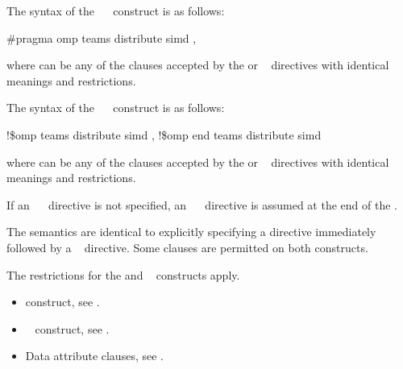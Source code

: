 \syntax
\ccppspecificstart
The syntax of the ~~ construct is as follows:

\begin{boxedcode}
\#pragma omp teams distribute simd \plc{[clause[ [},\plc{] clause] ... ]}
\end{boxedcode}

where  can be any of the clauses accepted by the  or ~ 
directives with identical meanings and restrictions.
\ccppspecificend

\fortranspecificstart
The syntax of the ~~ construct is as follows:

\begin{boxedcode}
!\$omp teams distribute simd \plc{[clause[ [},\plc{] clause] ... ]}
\plc{[}!\$omp end teams distribute simd\plc{]}
\end{boxedcode}

where  can be any of the clauses accepted by the  or ~ 
directives with identical meanings and restrictions.

If an ~~ directive is not specified, an 
~~ directive is assumed at the end of the .
\fortranspecificend

\descr
The semantics are identical to explicitly specifying a  directive immediately 
followed by a ~ directive. Some clauses are permitted on both constructs.

\restrictions
The restrictions for the  and ~ constructs apply.

\crossreferences
\begin{itemize}
\item {} construct, see 
.

\item {}~ construct, see 
.

\item Data attribute clauses, see 
.
\end{itemize}











